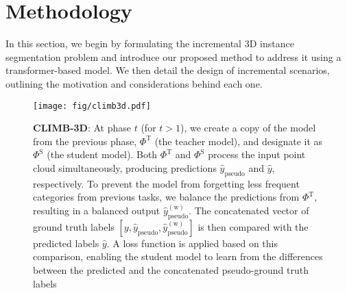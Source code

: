 \section{Methodology}
In this section, we begin by formulating the incremental 3D instance segmentation problem and introduce our proposed method to address it using a transformer-based model. We then detail the design of incremental scenarios, outlining the motivation and considerations behind each one. 


\begin{figure*}[t]
  \centering
  \texttt{[image: fig/climb3d.pdf]}
  \caption{\textbf{CLIMB-3D}: 
  At phase $t$ (for $t > 1$), we create a copy of the model from the previous phase, $\Phi^{\mathrm{T}}$ (the teacher model), and designate it as $\Phi^{\mathrm{S}}$ (the student model). 
  Both $\Phi^{\mathrm{T}}$ and $\Phi^{\mathrm{S}}$ process the input point cloud simultaneously, producing predictions $\hat{y}_\mathrm{pseudo}$ and $\hat{y}$, respectively. To prevent the model from forgetting less frequent categories from previous tasks, we balance the predictions from $\Phi^{\mathrm{T}}$, resulting in a balanced output $\hat{y}^\mathrm{(w)}_\mathrm{pseudo}$. The concatenated vector of ground truth labels $[y, \hat{y}_\mathrm{pseudo}, \hat{y}^\mathrm{(w)}_\mathrm{pseudo}]$ is then compared with the predicted labels $\hat{y}$. A loss function is applied based on this comparison, enabling the student model to learn from the differences between the predicted and the concatenated pseudo-ground truth labels
  }
  \label{fig:climb3d}
\end{figure*}

